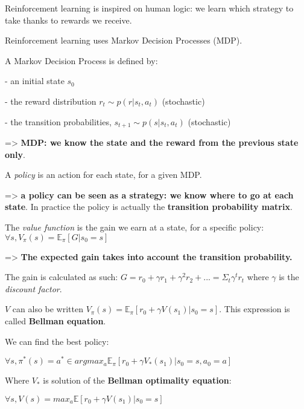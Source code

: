 Reinforcement learning is inspired on human logic: we learn which strategy to take thanks to rewards we receive.

\vspace{5mm}

Reinforcement learning uses Markov Decision Processes (MDP).

A Markov Decision Process is defined by:

- an initial state $s_0$

- the reward distribution $r_t \sim p(r | s_t, a_t)$ (stochastic)

- the transition probabilities, $s_{t+1} \sim p(s | s_t, a_t)$ (stochastic)

=> \textbf{MDP: we know the state and the reward from the previous state only}.

\vspace{5mm}

A \textit{policy} is an action for each state, for a given MDP.

=> \textbf{a policy can be seen as a strategy: we know where to go at each state}. In practice the policy is actually the \textbf{transition probability matrix}.

\vspace{5mm}

The \textit{value function} is the gain we earn at a state, for a specific policy: $\forall s, V_\pi(s) = \mathbb{E}_{\pi}[G | s_0 = s]$

=> \textbf{The expected gain takes into account the transition probability.}

The gain is calculated as such: $G = r_0 + \gamma r_1 + \gamma^2 r_2 +... = \Sigma_t \gamma^t r_t $ where $\gamma$ is the \textit{discount factor}.

$V$ can also be written $V_\pi(s) = \mathbb{E}_\pi[r_0 + \gamma V(s_1) | s_0 = s]$. This expression is called \textbf{Bellman equation}.

\vspace{5mm}

We can find the best policy:

$\forall s, \pi^*(s) = a^* \in argmax_a\mathbb{E}_\pi[r_0 + \gamma V_*(s_1) | s_0 = s, a_0 = a]$

Where $V_*$ is solution of the \textbf{Bellman optimality equation}:

$\forall s, V(s) = max_a\mathbb{E}[r_0 + \gamma V(s_1) | s_0 = s]$

\vspace{5mm}